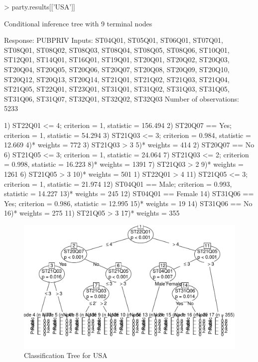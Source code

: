 \documentclass[nojss]{jss}
\begin{document}
\begin{Schunk}
\begin{Sinput}
> party.results[['USA']]
\end{Sinput}
\begin{Soutput}
	 Conditional inference tree with 9 terminal nodes

Response:  PUBPRIV 
Inputs:  ST04Q01, ST05Q01, ST06Q01, ST07Q01, ST08Q01, ST08Q02, ST08Q03, ST08Q04, ST08Q05, ST08Q06, ST10Q01, ST12Q01, ST14Q01, ST16Q01, ST19Q01, ST20Q01, ST20Q02, ST20Q03, ST20Q04, ST20Q05, ST20Q06, ST20Q07, ST20Q08, ST20Q09, ST20Q10, ST20Q12, ST20Q13, ST20Q14, ST21Q01, ST21Q02, ST21Q03, ST21Q04, ST21Q05, ST22Q01, ST23Q01, ST31Q01, ST31Q02, ST31Q03, ST31Q05, ST31Q06, ST31Q07, ST32Q01, ST32Q02, ST32Q03 
Number of observations:  5233 

1) ST22Q01 <= 4; criterion = 1, statistic = 156.494
  2) ST20Q07 == {Yes}; criterion = 1, statistic = 54.294
    3) ST21Q03 <= 3; criterion = 0.984, statistic = 12.669
      4)*  weights = 772 
    3) ST21Q03 > 3
      5)*  weights = 414 
  2) ST20Q07 == {No}
    6) ST21Q05 <= 3; criterion = 1, statistic = 24.064
      7) ST21Q03 <= 2; criterion = 0.998, statistic = 16.223
        8)*  weights = 1391 
      7) ST21Q03 > 2
        9)*  weights = 1261 
    6) ST21Q05 > 3
      10)*  weights = 501 
1) ST22Q01 > 4
  11) ST21Q05 <= 3; criterion = 1, statistic = 21.974
    12) ST04Q01 == {Male}; criterion = 0.993, statistic = 14.227
      13)*  weights = 245 
    12) ST04Q01 == {Female}
      14) ST31Q06 == {Yes}; criterion = 0.986, statistic = 12.995
        15)*  weights = 19 
      14) ST31Q06 == {No}
        16)*  weights = 275 
  11) ST21Q05 > 3
    17)*  weights = 355 
\end{Soutput}
\end{Schunk}

\begin{figure}[tp]
\begin{center}
\includegraphics{multilevelPSA-014}
\caption{Classification Tree for USA}
\label{fig:usatree}
\end{center}
\end{figure}
\end{document}
